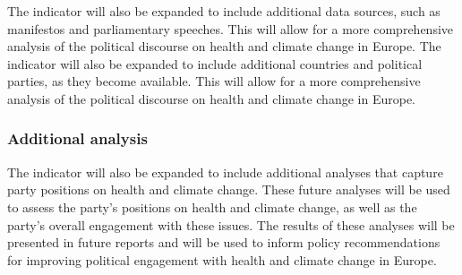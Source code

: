 \documentclass[
  letterpaper,
  DIV=11,
  numbers=noendperiod]{scrartcl}
\begin{document}
The indicator will also be expanded to include additional data sources,
such as manifestos and parliamentary speeches. This will allow for a
more comprehensive analysis of the political discourse on health and
climate change in Europe. The indicator will also be expanded to include
additional countries and political parties, as they become available.
This will allow for a more comprehensive analysis of the political
discourse on health and climate change in Europe.

\subsubsection{Additional analysis}\label{additional-analysis}

The indicator will also be expanded to include additional analyses that
capture party positions on health and climate change. These future
analyses will be used to assess the party's positions on health and
climate change, as well as the party's overall engagement with these
issues. The results of these analyses will be presented in future
reports and will be used to inform policy recommendations for improving
political engagement with health and climate change in Europe.

\newpage


\renewcommand\refname{References}
  
\end{document}
